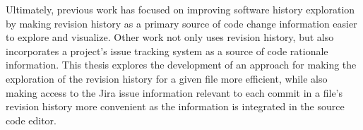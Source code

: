 
Ultimately, previous work has focused on improving software history exploration by making revision history as a primary source of code change information easier to explore and visualize.
Other work not only uses revision history, but also incorporates a project's issue tracking system as a source of code rationale information. 
This thesis explores the development of an approach for making the exploration of the revision history for a given file more efficient, while also making access to the Jira issue information relevant to each commit in a file's revision history more convenient as the information is integrated in the source code editor.

\endinput

Any text after an \endinput is ignored.
You could put scraps here or things in progress.